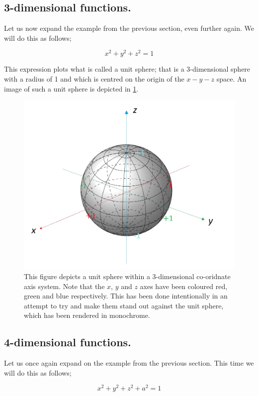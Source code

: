 \documentclass{article}
\begin{document}
\subsection{3-dimensional functions.}

Let us now expand the example from the previous section, even further again. We will do this as follows;

\begin{equation}
x^{2} + y^{2} + z^{2} = 1
\end{equation}

This expression plots what is called a unit sphere; that is a 3-dimensional sphere with a radius of 1 and
which is centred on the origin of the $x-y-z$ space. An image of such a unit sphere is depicted in
\ref{fig:Unit_sphere}.

% 

\begin{figure}
  \begin{center}
  \includegraphics[scale=0.5]{images/Sphere_with_x_y_z_axes.png}
  \end{center}
  \caption{This figure depicts a unit sphere within a 3-dimensional co-oridnate axis system. Note that the $x$, $y$
           and $z$ axes have been coloured red, green and blue respectively. This has been done intentionally in an
           attempt to try and make them stand out against the unit sphere, which has been rendered in monochrome.}
  \label{fig:Unit_sphere}
\end{figure}


\subsection{4-dimensional functions.}

Let us once again expand on the example from the previous section. This time we will do this as follows;

\begin{equation}
x^{2} + y^{2} + z^{2} + a^{2} = 1
\end{equation}
\end{document}
